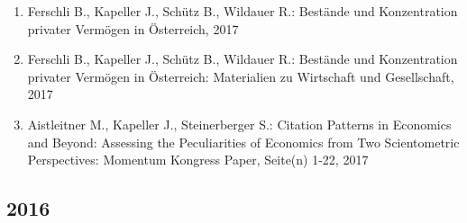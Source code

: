 \begin{enumerate}
	 \item Ferschli B., Kapeller J., Schütz B., Wildauer R.: Bestände und Konzentration privater Vermögen in Österreich, 2017
	 \item Ferschli B., Kapeller J., Schütz B., Wildauer R.: Bestände und Konzentration privater Vermögen in Österreich: Materialien zu Wirtschaft und Gesellschaft, 2017
	 \item Aistleitner M., Kapeller J., Steinerberger S.: Citation Patterns in Economics and Beyond: Assessing the Peculiarities of Economics from Two Scientometric Perspectives: Momentum Kongress Paper, Seite(n) 1-22, 2017
\end{enumerate}
\subsection*{2016}
